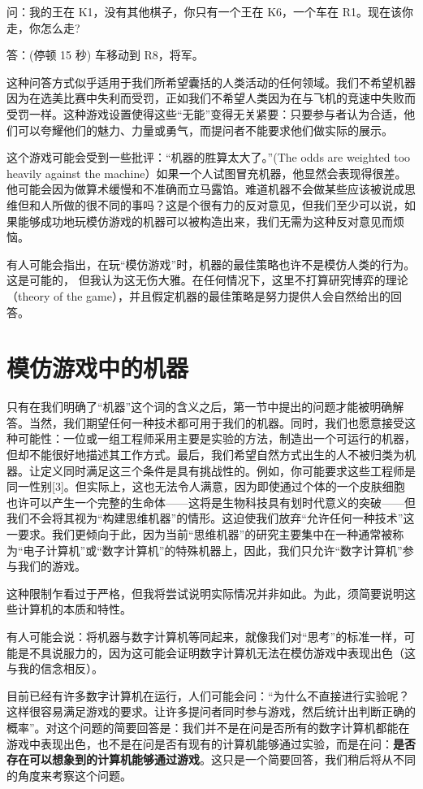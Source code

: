 \documentclass[12pt,a4paper,twoside]{article}
\begin{document}
问：我的王在 K1，没有其他棋子，你只有一个王在 K6，一个车在 R1。现在该你走，你怎么走?

答：(停顿 15 秒) 车移动到 R8，将军。

这种问答方式似乎适用于我们所希望囊括的人类活动的任何领域。我们不希望机器因为在选美比赛中失利而受罚，正如我们不希望人类因为在与飞机的竞速中失败而受罚一样。这种游戏设置使得这些“无能”变得无关紧要：只要参与者认为合适，他们可以夸耀他们的魅力、力量或勇气，而提问者不能要求他们做实际的展示。

这个游戏可能会受到一些批评：“机器的胜算太大了。”(The odds are weighted too heavily against the machine）如果一个人试图冒充机器，他显然会表现得很差。他可能会因为做算术缓慢和不准确而立马露馅。难道机器不会做某些应该被说成思维但和人所做的很不同的事吗？这是个很有力的反对意见，但我们至少可以说，如果能够成功地玩模仿游戏的机器可以被构造出来，我们无需为这种反对意见而烦恼。

有人可能会指出，在玩“模仿游戏”时，机器的最佳策略也许不是模仿人类的行为。这是可能的， 但我认为这无伤大雅。在任何情况下，这里不打算研究博弈的理论（theory of the game），并且假定机器的最佳策略是努力提供人会自然给出的回答。

\section{模仿游戏中的机器}
只有在我们明确了“机器”这个词的含义之后，第一节中提出的问题才能被明确解答。当然，我们期望任何一种技术都可用于我们的机器。同时，我们也愿意接受这种可能性：一位或一组工程师采用主要是实验的方法，制造出一个可运行的机器，但却不能很好地描述其工作方式。最后，我们希望自然方式出生的人不被归类为机器。让定义同时满足这三个条件是具有挑战性的。例如，你可能要求这些工程师是同一性别[3]。但实际上，这也无法令人满意，因为即使通过个体的一个皮肤细胞也许可以产生一个完整的生命体——这将是生物科技具有划时代意义的突破——但我们不会将其视为“构建思维机器”的情形。这迫使我们放弃“允许任何一种技术”这一要求。我们更倾向于此，因为当前“思维机器”的研究主要集中在一种通常被称为“电子计算机”或“数字计算机”的特殊机器上，因此，我们只允许“数字计算机”参与我们的游戏。

这种限制乍看过于严格，但我将尝试说明实际情况并非如此。为此，须简要说明这些计算机的本质和特性。

有人可能会说：将机器与数字计算机等同起来，就像我们对“思考”的标准一样，可能是不具说服力的，因为这可能会证明数字计算机无法在模仿游戏中表现出色（这与我的信念相反）。

目前已经有许多数字计算机在运行，人们可能会问：“为什么不直接进行实验呢？这样很容易满足游戏的要求。让许多提问者同时参与游戏，然后统计出判断正确的概率”。对这个问题的简要回答是：我们并不是在问是否所有的数字计算机都能在游戏中表现出色，也不是在问是否有现有的计算机能够通过实验，而是在问：\textbf{是否存在可以想象到的计算机能够通过游戏}。这只是一个简要回答，我们稍后将从不同的角度来考察这个问题。
\end{document}
